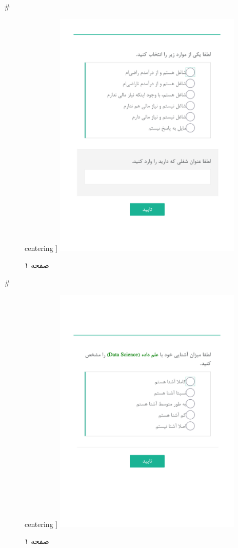 { 
 # 
\begin{figure}[htpb]
centering ]
\includegraphics[width=0.8\textwidth]{./img/Task12.png/}
\caption{صفحه ۱}
\label{fig:Task1}
\end{figure}
 
 
 # 
\begin{figure}[htpb]
centering ]
\includegraphics[width=0.8\textwidth]{./img/Task13.png/}
\caption{صفحه ۱}
\label{fig:Task1}
\end{figure}
 
}
